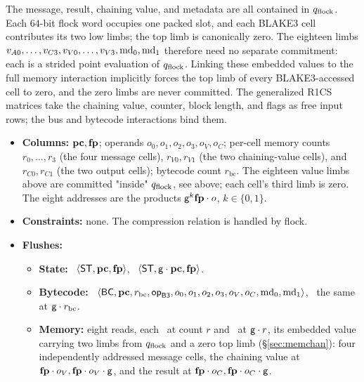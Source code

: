 The message, result, chaining value, and metadata are all contained in $q_{\mathrm{flock}}$. Each $64$-bit flock word occupies one packed slot, and each BLAKE3 cell contributes its two low limbs; the top limb is canonically zero. The eighteen limbs $v_{A0},\dots,v_{C3},v_{V0},\dots,v_{V3},\mathrm{md}_0,\mathrm{md}_1$ therefore need no separate commitment: each is a strided point evaluation of $q_{\mathrm{flock}}$. Linking these embedded values to the full memory interaction implicitly forces the top limb of every BLAKE3-accessed cell to zero, and the zero limbs are never committed. The generalized R1CS matrices take the chaining value, counter, block length, and flags as free input rows; the bus and bytecode interactions bind them.
\begin{itemize}
\item \textbf{Columns:} $\mathbf{pc},\mathbf{fp}$; operands $o_0,o_1,o_2,o_3,o_V,o_C$; per-cell memory counts $r_0,\dots,r_3$ (the four message cells), $r_{V0},r_{V1}$ (the two chaining-value cells), and $r_{C0},r_{C1}$ (the two output cells); bytecode count $r_{\mathrm{bc}}$. The eighteen value limbs above are committed "inside" $q_{\mathrm{flock}}$, see above; each cell's third limb is zero. The eight addresses are the products $\mathsf{g}^{k}\mathbf{fp}\cdot o$, $k\in\{0,1\}$.
\item \textbf{Constraints:} none. The compression relation is handled by flock.
\item \textbf{Flushes:}
  \begin{itemize}
  \item \textbf{State:} \pull\ $\langle \mathsf{ST},\mathbf{pc},\mathbf{fp} \rangle$, \push\ $\langle \mathsf{ST},\mathsf{g}\cdot\mathbf{pc},\mathbf{fp} \rangle$.
  \item \textbf{Bytecode:} \pull\ $\langle \mathsf{BC},\mathbf{pc},r_{\mathrm{bc}},\mathsf{op}_{\mathsf{B3}},o_0,o_1,o_2,o_3,o_V,o_C,\mathrm{md}_0,\mathrm{md}_1 \rangle$, \push\ the same at $\mathsf{g}\cdot r_{\mathrm{bc}}$.
  \item \textbf{Memory:} eight reads, each \pull\ at count $r$ and \push\ at $\mathsf{g}\cdot r$, its embedded value carrying two limbs from $q_{\mathrm{flock}}$ and a zero top limb (\S\ref{sec:memchan}): four independently addressed message cells, the chaining value at $\mathbf{fp}\cdot o_V,\mathbf{fp}\cdot o_V \cdot \mathsf{g}$, and the result at $\mathbf{fp}\cdot o_C,\mathbf{fp}\cdot o_C \cdot \mathsf{g}$.
  \end{itemize}
\end{itemize}
